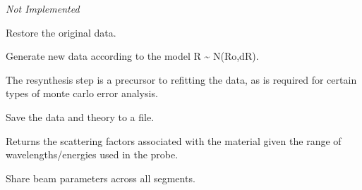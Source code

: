 \documentclass[letterpaper,10pt,english]{sphinxmanual}
\begin{document}
\begin{fulllineitems}
\begin{fulllineitems}
\emph{Not Implemented}

\end{fulllineitems}


\begin{fulllineitems}
\label{api/probe:refl1d.probe.ProbeSet.restore_data}
Restore the original data.

\end{fulllineitems}


\begin{fulllineitems}
\label{api/probe:refl1d.probe.ProbeSet.resynth_data}
Generate new data according to the model R \textasciitilde{} N(Ro,dR).

The resynthesis step is a precursor to refitting the data, as is
required for certain types of monte carlo error analysis.

\end{fulllineitems}


\begin{fulllineitems}
\label{api/probe:refl1d.probe.ProbeSet.save}
Save the data and theory to a file.

\end{fulllineitems}


\begin{fulllineitems}
\label{api/probe:refl1d.probe.ProbeSet.scattering_factors}
Returns the scattering factors associated with the material given
the range of wavelengths/energies used in the probe.

\end{fulllineitems}


\begin{fulllineitems}
\label{api/probe:refl1d.probe.ProbeSet.shared_beam}
Share beam parameters across all segments.


\end{fulllineitems}
\end{fulllineitems}
\end{document}
